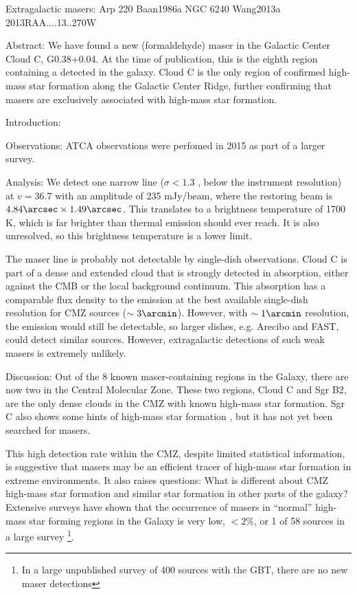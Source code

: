 Extragalactic masers:
Arp 220 Baan1986a
NGC 6240 Wang2013a 2013RAA....13..270W

Abstract:
We have found a new \formaldehyde \oneone (formaldehyde) maser in the Galactic
Center Cloud C, G0.38+0.04.  At the time of publication, this is the eighth
region containing a \formaldehyde detected in the galaxy.  Cloud C is the only
region of confirmed high-mass star formation along the Galactic Center Ridge,
further confirming that \formaldehyde masers are exclusively associated with high-mass
star formation.


Introduction:

Observations:
ATCA observations were perfomed in 2015 as part of a larger survey.

Analysis:
We detect one narrow line ($\sigma<1.3$ \kms, below the instrument resolution)
at $v=36.7$ \kms with an amplitude of 235 mJy/beam, where the restoring beam is
$4.84\arcsec\times1.49\arcsec$.  This translates to a brightness temperature of
1700 K, which is far brighter than thermal \formaldehyde emission should ever
reach.  It is also unresolved, so this brightness temperature is a lower limit.

The maser line is probably not detectable by single-dish observations.  Cloud C
is part of a dense and extended cloud that is strongly detected in absorption,
either against the CMB or the local background continuum.  This absorption has
a comparable flux density to the emission at the best available single-dish resolution
for CMZ sources ($\sim3\arcmin$).  However, with $\sim1\arcmin$ resolution, the 
emission would still be detectable, so larger dishes, e.g. Arecibo and FAST,
could detect similar sources.  However, extragalactic detections of such weak
masers is extremely unlikely.

Discussion:
Out of the 8 known maser-containing regions in the Galaxy, there are now two in
the Central Molecular Zone.  These two regions, Cloud C and Sgr B2, are the only
dense clouds in the CMZ with known high-mass star formation.  Sgr C also shows
some hints of high-mass star formation \citep{Kendrew2013a}, but it has not yet
been searched for \formaldehyde masers.

This high detection rate within the CMZ, despite limited statistical
information, is suggestive that \formaldehyde masers may be an efficient tracer
of high-mass star formation in extreme environments.
It also raises questions: What is different about CMZ high-mass star formation and
similar star formation in other parts of the galaxy?  Extensive surveys have shown
that the occurrence of \formaldehyde masers in ``normal'' high-mass star
forming regions in the Galaxy is very low, $<2\%$, or 1 of 58 sources in a
large survey \citep{Araya2004a,Araya2007a,Araya2008a}\footnote{In a large unpublished survey
of 400 sources with the GBT, there are no new maser detections}.  
